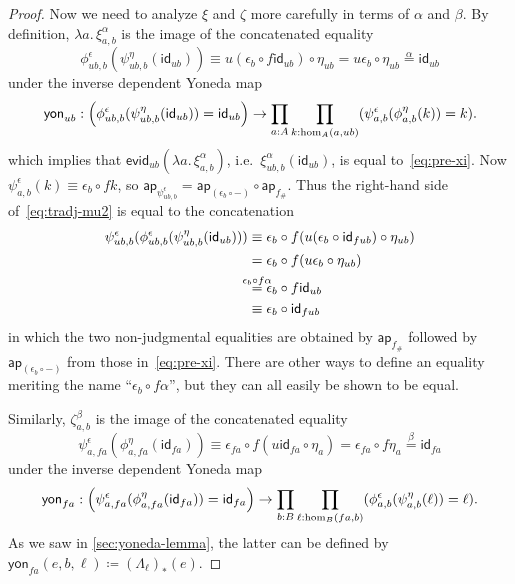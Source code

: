 \documentclass{amsart}
\theoremstyle{plain}
\theoremstyle{definition}
\theoremstyle{remark}
\numberwithin{equation}{section}
\newcommand{\extfn}[1]{{#1}_\#}
\newcommand{\jdeq}{\equiv}
\newcommand{\defeq}{\coloneqq}
\newcommand{\evid}{\mathsf{evid}}
\newcommand{\yon}{\mathsf{yon}}
\newcommand{\connmin}[1]{\mathsf{\Lambda}_{#1}}
\newcommand{\lam}[1]{\lambda #1.\,}
\newcommand{\idarr}[1]{\mathsf{id}_{#1}}
\newcommand{\ap}{\mathsf{ap}}                             %
\newcommand{\covtr}[1]{{#1}_*}  %
\newcommand{\Parens}[1]{\Bigl(#1\Bigr)}
\begin{document}
\begin{proof}
  Now we need to analyze $\xi$ and $\zeta$ more carefully in terms of $\alpha$ and $\beta$.
  By definition, $\lam{a}\xi^\alpha_{a,b}$ is the image of the concatenated equality
  \begin{equation}
  \phi^\epsilon_{ub,b}(\psi^\eta_{ub,b}(\idarr{ub})) \jdeq 
  u(\epsilon_b \circ f\idarr{ub}) \circ \eta_{ub}
  = u\epsilon_b \circ \eta_{ub} \overset\alpha= \idarr{ub}\label{eq:pre-xi}
  \end{equation}
  under the inverse dependent Yoneda map
  \[ \yon_{ub} :
  \Parens{\phi^\epsilon_{ub,b}(\psi^\eta_{ub,b}(\idarr{ub})) = \idarr{ub}}
  \to  \prod_{a:A} \prod_{k:\hom_A(a,ub)} (\psi^\epsilon_{a,b}(\phi^\eta_{a,b}(k)) = k).
  \]
  which implies that $\evid_{ub}(\lam{a}\xi^\alpha_{a,b})$, i.e.\ $\xi^\alpha_{ub,b}(\idarr{ub})$, is equal to~\eqref{eq:pre-xi}.
  Now $\psi^\epsilon_{a,b}(k) \jdeq \epsilon_b \circ fk$, so $\ap_{\psi^\epsilon_{ub,b}} = \ap_{(\epsilon_b\circ -)} \circ \ap_{\extfn f}$.
  Thus the right-hand side of~\eqref{eq:tradj-mu2} is equal to the concatenation
  \begin{align}
    \psi^\epsilon_{ub,b}(\phi^\epsilon_{ub,b}(\psi^\eta_{ub,b}(\idarr{ub})))
    &\jdeq \epsilon_b \circ f(u(\epsilon_b \circ \idarr{fub}) \circ \eta_{ub}) \notag\\
    &= \epsilon_b \circ f(u\epsilon_b \circ \eta_{ub}) \notag\\
    &\overset{\mathclap{\epsilon_b \circ f\alpha}}= \epsilon_b \circ f\idarr{ub} \label{eq:ep-f-alpha}\\
    &\jdeq \epsilon_b \circ \idarr{fub}\notag
  \end{align}
  in which the two non-judgmental equalities are obtained by $\ap_{\extfn f}$ followed by $\ap_{(\epsilon_b\circ -)}$ from those in~\eqref{eq:pre-xi}.
  There are other ways to define an equality meriting the name ``${\epsilon_b \circ f\alpha}$'', but they can all easily be shown to be equal.

  Similarly, $\zeta^\beta_{a,b}$ is the image of the concatenated equality
  \begin{equation}\label{eq:pre-zeta}
    \psi^\epsilon_{a,fa}(\phi^\eta_{a,fa}(\idarr{fa}))
    \jdeq \epsilon_{fa} \circ f(u\idarr{fa} \circ \eta_a)
    = \epsilon_{fa} \circ f\eta_a
    \overset{\beta}= \idarr{fa}
  \end{equation}
  under the inverse dependent Yoneda map
  \begin{equation*}
    \yon_{fa} : \Parens{\psi^\epsilon_{a,fa}(\phi^\eta_{a,fa}(\idarr{fa})) = \idarr{fa}}
    \to \prod_{b:B} \prod_{\ell:\hom_B(fa,b)} (\phi^\epsilon_{a,b}(\psi^\eta_{a,b}(\ell)) = \ell).
  \end{equation*}
  As we saw in \cref{sec:yoneda-lemma}, the latter can be defined by $\yon_{fa}(e,b,\ell) \defeq \covtr{(\connmin \ell)}(e)$.


\end{proof}
\end{document}
